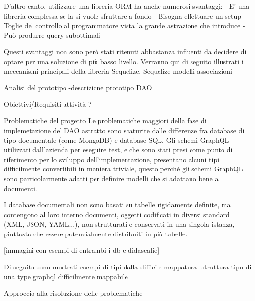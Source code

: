         D'altro canto, utilizzare una libreria ORM ha anche numerosi svantaggi:
            - E' una libreria complessa se la si vuole sfruttare a fondo
            - Bisogna effettuare un setup
            - Toglie del controllo al programmatore vista la grande astrazione che introduce
            - Può produrre query subottimali

        Questi svantaggi non sono però stati ritenuti abbastanza influenti da decidere di optare per una soluzione di più basso livello.
        Verranno qui di seguito illustrati i meccanismi principali della libreria Sequelize.
        Sequelize
        modelli
        associazioni
    
    Analisi del prototipo
        -descrizione prototipo DAO

    Obiettivi/Requisiti attività ?

    Problematiche del progetto
        Le problematiche maggiori della fase di implemetazione del DAO astratto sono scaturite dalle differenze fra database di tipo documentale (come MongoDB) e database SQL.
        Gli schemi GraphQL utilizzati dall'azienda per eseguire test, e che sono stati presi come punto di riferimento per lo sviluppo dell'implementazione, presentano alcuni tipi difficilmente convertibili in maniera triviale, questo perchè gli schemi GraphQL sono
        particolarmente adatti per definire modelli che si adattano bene a documenti.

        I database documentali non sono basati su tabelle rigidamente definite, ma contengono al loro interno documenti, oggetti codificati in diversi standard (XML, JSON, YAML...), non strutturati e conservati in una singola istanza, piuttosto che essere potenzialmente distribuiti in più tabelle.
        
        [immagini con esempi di entrambi i db e didascalie]

        Di seguito sono mostrati esempi di tipi dalla difficile mappatura
        -struttura tipo di una type graphql difficilmente mappabile

    Approccio alla risoluzione delle problematiche
    



